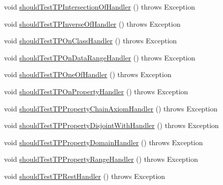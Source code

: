 \begin{DoxyCompactItemize}
\item 
void \hyperlink{classorg_1_1semanticweb_1_1owlapi_1_1contract_1_1_contract_rdfxml_parser_test_a324bef665a8ffcade1d05c21b88efa09}{should\-Test\-T\-P\-Intersection\-Of\-Handler} ()  throws Exception 
\item 
void \hyperlink{classorg_1_1semanticweb_1_1owlapi_1_1contract_1_1_contract_rdfxml_parser_test_a5ae7dcaa1afdcfdc611eb1d318cd712f}{should\-Test\-T\-P\-Inverse\-Of\-Handler} ()  throws Exception 
\item 
void \hyperlink{classorg_1_1semanticweb_1_1owlapi_1_1contract_1_1_contract_rdfxml_parser_test_a5de4130969105258fe8443177e0c3b45}{should\-Test\-T\-P\-On\-Class\-Handler} ()  throws Exception 
\item 
void \hyperlink{classorg_1_1semanticweb_1_1owlapi_1_1contract_1_1_contract_rdfxml_parser_test_a789cf76ceb69f96805f94df458df396c}{should\-Test\-T\-P\-On\-Data\-Range\-Handler} ()  throws Exception 
\item 
void \hyperlink{classorg_1_1semanticweb_1_1owlapi_1_1contract_1_1_contract_rdfxml_parser_test_a5fb2f6ce645247a7056a4f8294260891}{should\-Test\-T\-P\-One\-Of\-Handler} ()  throws Exception 
\item 
void \hyperlink{classorg_1_1semanticweb_1_1owlapi_1_1contract_1_1_contract_rdfxml_parser_test_ad09a3ed97f0a43906a00e51c958fe6d9}{should\-Test\-T\-P\-On\-Property\-Handler} ()  throws Exception 
\item 
void \hyperlink{classorg_1_1semanticweb_1_1owlapi_1_1contract_1_1_contract_rdfxml_parser_test_a40d4ae5ef552020e98577a01c99b834e}{should\-Test\-T\-P\-Property\-Chain\-Axiom\-Handler} ()  throws Exception 
\item 
void \hyperlink{classorg_1_1semanticweb_1_1owlapi_1_1contract_1_1_contract_rdfxml_parser_test_afb0fc4768a2514cad84102b3beeb8990}{should\-Test\-T\-P\-Property\-Disjoint\-With\-Handler} ()  throws Exception 
\item 
void \hyperlink{classorg_1_1semanticweb_1_1owlapi_1_1contract_1_1_contract_rdfxml_parser_test_a3ce277c7025d1d656095a98e8266cd06}{should\-Test\-T\-P\-Property\-Domain\-Handler} ()  throws Exception 
\item 
void \hyperlink{classorg_1_1semanticweb_1_1owlapi_1_1contract_1_1_contract_rdfxml_parser_test_ac2c8ce6be961b1880cfbf590a48bf449}{should\-Test\-T\-P\-Property\-Range\-Handler} ()  throws Exception 
\item 
void \hyperlink{classorg_1_1semanticweb_1_1owlapi_1_1contract_1_1_contract_rdfxml_parser_test_ad20330159024ada90631d66937286cf2}{should\-Test\-T\-P\-Rest\-Handler} ()  throws Exception 

\end{DoxyCompactItemize}
